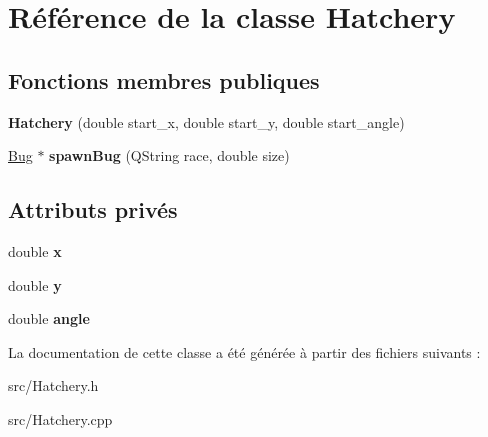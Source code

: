 \hypertarget{classHatchery}{
\section{Référence de la classe Hatchery}
\label{classHatchery}
}
\subsection*{Fonctions membres publiques}
\begin{DoxyCompactItemize}
\item 
\hypertarget{classHatchery_a8e86b7578b70f37fb3f7ed2e69c765b7}{
{\bfseries Hatchery} (double start\_\-x, double start\_\-y, double start\_\-angle)}
\label{classHatchery_a8e86b7578b70f37fb3f7ed2e69c765b7}

\item 
\hypertarget{classHatchery_af90645b2be3e8890829a69347846a934}{
\hyperlink{classBug}{Bug} $\ast$ {\bfseries spawnBug} (QString race, double size)}
\label{classHatchery_af90645b2be3e8890829a69347846a934}

\end{DoxyCompactItemize}
\subsection*{Attributs privés}
\begin{DoxyCompactItemize}
\item 
\hypertarget{classHatchery_ae56bf748a2046b42e2b174c17e4caeda}{
double {\bfseries x}}
\label{classHatchery_ae56bf748a2046b42e2b174c17e4caeda}

\item 
\hypertarget{classHatchery_a99f0ef4a290d0bc1e65976b5979b29b7}{
double {\bfseries y}}
\label{classHatchery_a99f0ef4a290d0bc1e65976b5979b29b7}

\item 
\hypertarget{classHatchery_a4e56c9314b9a9dfe1718d43e30f3d4d0}{
double {\bfseries angle}}
\label{classHatchery_a4e56c9314b9a9dfe1718d43e30f3d4d0}

\end{DoxyCompactItemize}


La documentation de cette classe a été générée à partir des fichiers suivants :\begin{DoxyCompactItemize}
\item 
src/Hatchery.h\item 
src/Hatchery.cpp\end{DoxyCompactItemize}
